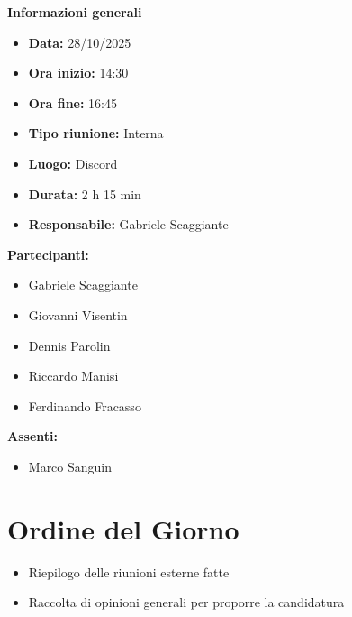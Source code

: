 \documentclass[a4paper,12pt]{article}
\begin{document}
\clearpage
{\large \textbf{Informazioni generali}}
{\footnotesize
{}

\begin{itemize}
    \item \textbf{Data:} 28/10/2025
    \item \textbf{Ora inizio:} 14:30
    \item \textbf{Ora fine:} 16:45
    \item \textbf{Tipo riunione:} Interna
    \item \textbf{Luogo:} Discord
    \item \textbf{Durata:} 2 h 15 min
    \item \textbf{Responsabile:} Gabriele Scaggiante
\end{itemize}

\vspace{0.2cm}

\textbf{Partecipanti:}
\begin{itemize}
    \item Gabriele Scaggiante
    \item Giovanni Visentin
    \item Dennis Parolin 
    \item Riccardo Manisi
    \item Ferdinando Fracasso
\end{itemize}

\textbf{Assenti:}
\begin{itemize}
    \item Marco Sanguin
\end{itemize}
}

\vspace{0.5cm}

\vspace{0.8cm}

\clearpage
\tableofcontents
\thispagestyle{empty} %
\clearpage

\section{Ordine del Giorno}
\begin{itemize}
    \item Riepilogo delle riunioni esterne fatte
    \item Raccolta di opinioni generali per proporre la candidatura
\end{itemize}
\end{document}
